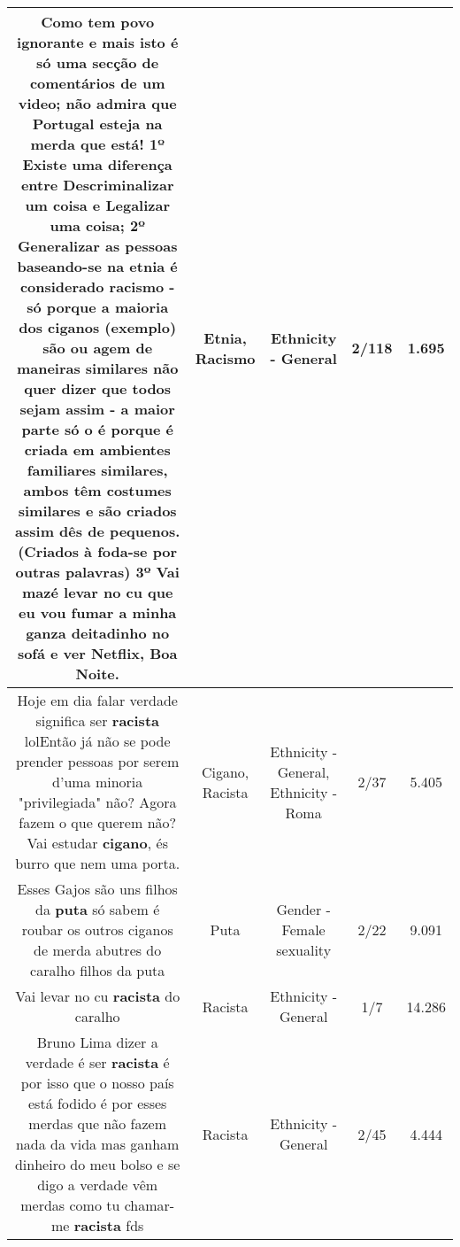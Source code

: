 \documentclass[11pt]{article}
\newlength\mylength
\begin{document}
\begin{center}
\begin{longtable}{|C{.65\mylength}|C{.30\mylength}|C{.12\mylength}|C{.12\mylength}|C{.12\mylength}|}
  \small Como tem povo ignorante e mais isto é só uma secção de comentários de um video; não admira que Portugal esteja na merda que está! 1º Existe uma diferença entre Descriminalizar um coisa e Legalizar uma coisa; 2º Generalizar as pessoas baseando-se na \textbf{etnia} é considerado \textbf{racismo} -só porque a maioria dos ciganos (exemplo) são ou agem de maneiras similares não quer dizer que todos sejam assim - a maior parte só o é porque é criada em ambientes familiares similares, ambos têm costumes similares e são criados assim dês de pequenos.(Criados à foda-se por outras palavras) 3º Vai mazé levar no cu que eu vou fumar a minha ganza deitadinho no sofá e ver Netflix, Boa Noite.\normalsize   & Etnia, Racismo & Ethnicity - General & 2/118 & 1.695 \\  \hline
  \small Hoje em dia falar verdade significa ser \textbf{racista} lolEntão já não se pode prender pessoas por serem d'uma minoria "privilegiada" não? Agora fazem o que querem não? Vai estudar \textbf{cigano}, és burro que nem uma porta.\normalsize   & Cigano, Racista & Ethnicity - General, Ethnicity - Roma & 2/37 & 5.405 \\  \hline
  \small Esses Gajos são uns filhos da \textbf{puta} só sabem é roubar os outros ciganos de merda abutres do caralho filhos da puta\normalsize   & Puta & Gender - Female sexuality & 2/22 & 9.091 \\  \hline
  \small Vai levar no cu \textbf{racista} do caralho\normalsize   & Racista & Ethnicity - General & 1/7 & 14.286 \\  \hline
  \small Bruno Lima dizer a verdade é ser \textbf{racista} é por isso que o nosso país está fodido é por esses merdas que não fazem nada da vida mas ganham dinheiro do meu bolso e se digo a verdade vêm merdas como tu chamar-me \textbf{racista} fds\normalsize   & Racista & Ethnicity - General & 2/45 & 4.444 \\  \hline
  
\end{longtable}
\end{center}
\end{document}
